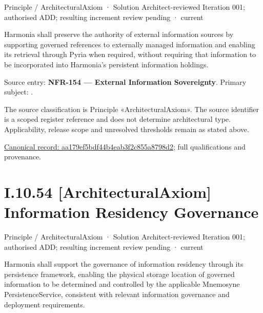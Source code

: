 \label{element:aa179ef5bdf44b4eab3f2c855a8798d2}
{\small Principle / ArchitecturalAxiom · Solution Architect-reviewed Iteration 001; authorised ADD; resulting increment review pending · current}\par

Harmonia shall preserve the authority of external information sources by supporting governed references to externally managed information and enabling its retrieval through Pyria when required, without requiring that information to be incorporated into Harmonia's persistent information holdings.



Source entry: \textbf{NFR-154 — External Information Sovereignty}. Primary subject: \texttt{}.



The source classification is Principle «ArchitecturalAxiom». The source identifier is a scoped register reference and does not determine architectural type. Applicability, release scope and unresolved thresholds remain as stated above.


{\footnotesize \href{../../../../../../../../continuum/motivation/principle/architectural-axiom/aa179ef5bdf44b4eab3f2c855a8798d2.md}{Canonical record: aa179ef5bdf44b4eab3f2c855a8798d2}; full qualifications and provenance.}\par
\section*{I.10.54 [ArchitecturalAxiom] Information Residency Governance}
\label{navigation:I.10.54}

\label{element:349f526a401e4e299b854cbfedad0fca}
{\small Principle / ArchitecturalAxiom · Solution Architect-reviewed Iteration 001; authorised ADD; resulting increment review pending · current}\par

Harmonia shall support the governance of information residency through its persistence framework, enabling the physical storage location of governed information to be determined and controlled by the applicable Mnemosyne PersistenceService, consistent with relevant information governance and deployment requirements.



